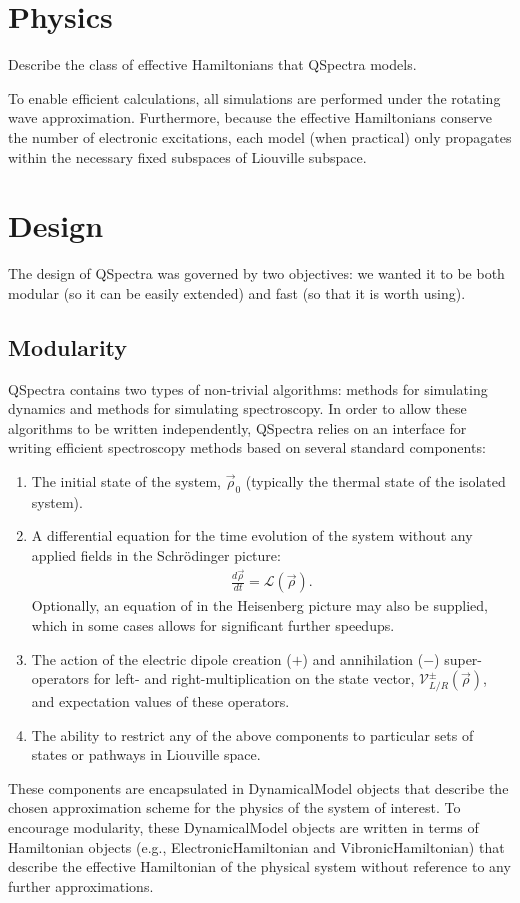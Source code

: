 \documentclass{article}
\begin{document}
\section{Physics}

Describe the class of effective Hamiltonians that QSpectra models.

To enable efficient calculations, all simulations are performed under the
rotating wave approximation. Furthermore, because the effective Hamiltonians
conserve the number of electronic excitations, each model (when practical) only
propagates within the necessary fixed subspaces of Liouville subspace.

\section{Design}

The design of QSpectra was governed by two objectives: we wanted it to be both modular (so it can be easily extended) and fast (so that it is worth using).

\subsection{Modularity}

QSpectra contains two types of non-trivial algorithms: methods for simulating dynamics and methods for simulating spectroscopy. In order to allow these algorithms to be written independently, QSpectra relies on an interface for writing efficient spectroscopy methods based on several standard components:
\begin{enumerate}
	\item The initial state of the system, $\vec\rho_0$ (typically the thermal state of the isolated system).
	\item A differential equation for the time evolution of the system without any applied fields in the Schrödinger picture:
		\begin{align}
			\frac{d\vec\rho}{dt} = \mathcal{L}(\vec\rho).
		\end{align}
	Optionally, an equation of in the Heisenberg picture may also be supplied, which in some cases allows for significant further speedups.
	\item The action of the electric dipole creation ($+$) and annihilation ($-$) super-operators for left- and right-multiplication on the state vector, $\mathcal{V}^\pm_{L/R} (\vec\rho)$, and expectation values of these operators.
	\item The ability to restrict any of the above components to particular sets of states or pathways in Liouville space.
\end{enumerate}
These components are encapsulated in DynamicalModel objects that describe the chosen approximation scheme for the physics of the system of interest. To encourage modularity, these DynamicalModel objects are written in terms of Hamiltonian objects (e.g., ElectronicHamiltonian and VibronicHamiltonian) that describe the effective Hamiltonian of the physical system without reference to any further approximations.
\end{document}

